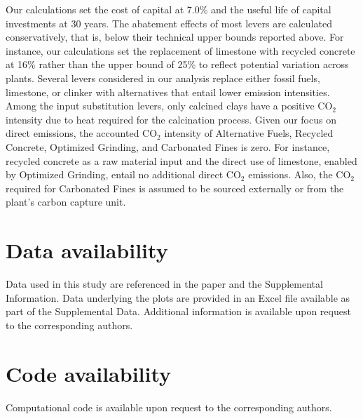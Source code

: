 \documentclass[12pt, a4paper]{article} %
\newcommand{\Suppl}{Supplemental}
\begin{document}
Our calculations set the cost of capital at 7.0\% and the useful life of capital investments at 30 years. The abatement effects of most levers are calculated conservatively, that is, below their technical upper bounds reported above. For instance, our calculations set the replacement of limestone with recycled concrete at 16\% rather than the upper bound of 25\% to reflect potential variation across plants. Several levers considered in our analysis replace either fossil fuels, limestone, or clinker with alternatives that entail lower emission intensities. Among the input substitution levers, only calcined clays have a positive CO$_2$ intensity due to heat required for the calcination process. Given our focus on direct emissions, the accounted CO$_2$ intensity of Alternative Fuels, Recycled Concrete, Optimized Grinding, and Carbonated Fines is zero. For instance, recycled concrete as a raw material input and the direct use of limestone, enabled by Optimized Grinding, entail no additional direct CO$_2$ emissions. Also, the CO$_2$ required for Carbonated Fines is assumed to be sourced externally or from the plant's carbon capture unit.


\section*{Data availability}
Data used in this study are referenced in the paper and the \Suppl$ $ Information. Data underlying the plots are provided in an Excel file available as part of the \Suppl$ $ Data. Additional information is available upon request to the corresponding authors.

\section*{Code availability}
Computational code is available upon request to the corresponding authors.

% 

{\small }
\end{document}

